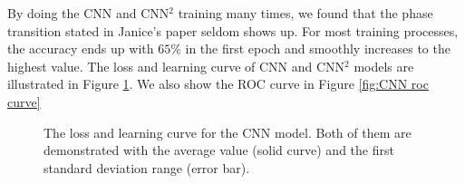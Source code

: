 \documentclass[12pt]{article}
\begin{document}
		By doing the CNN and CNN$^2$ training many times, we found that the phase transition stated in Janice's paper seldom shows up. For most training processes, the accuracy ends up with $65\%$ in the first epoch and smoothly increases to the highest value. The loss and learning curve of CNN and CNN$^2$ models are illustrated in Figure \ref{fig:CNN learning curve}. We also show the ROC curve in Figure \ref{fig:CNN roc curve}
		\begin{figure}[htpb]
			\centering
			\caption{The loss and learning curve for the CNN model. Both of them are demonstrated with the average value (solid curve) and the first standard deviation range (error bar).}
			\label{fig:CNN learning curve}
		\end{figure}
\end{document}
